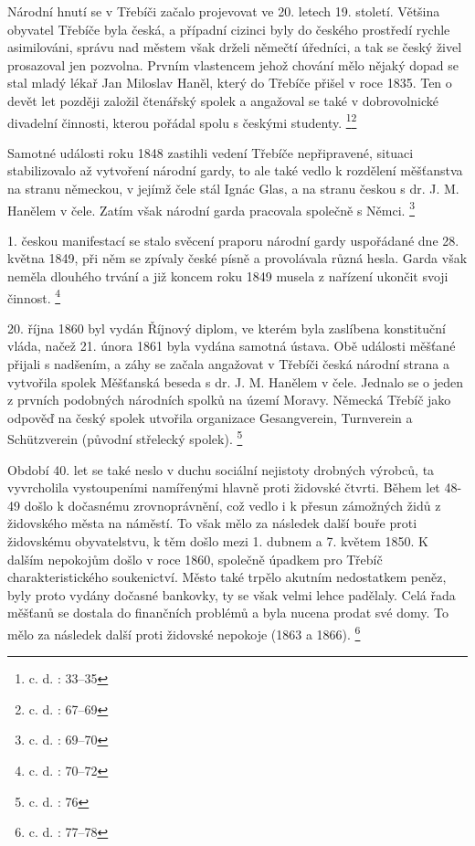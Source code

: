 \documentclass[a4paper,oneside,12p]{report}
\begin{document}
Národní hnutí se v Třebíči začalo projevovat ve 20. letech 19. století.
Většina obyvatel Třebíče byla česká, a případní cizinci byly do českého prostředí rychle asimilováni, správu nad městem však drželi němečtí úředníci, a tak se český živel prosazoval jen pozvolna.
Prvním vlastencem jehož chování mělo nějaký dopad se stal mladý lékař Jan Miloslav Haněl, který do Třebíče přišel v roce 1835.
Ten o devět let později založil čtenářský spolek a angažoval se také v dobrovolnické divadelní činnosti, kterou pořádal spolu s českými studenty. \footnote{c. d. : 33--35}\footnote{c. d. : 67--69}

Samotné události roku 1848 zastihli vedení Třebíče nepřipravené, situaci stabilizovalo až vytvoření národní gardy, to ale také vedlo k rozdělení měšťanstva na stranu německou, v jejímž čele stál Ignác Glas, a na stranu českou s dr. J. M. Hanělem v čele.
Zatím však národní garda pracovala společně s Němci. \footnote{c. d. : 69--70}

1. českou manifestací se stalo svěcení praporu národní gardy uspořádané dne 28. května 1849, při něm se zpívaly české písně a provolávala různá hesla.
Garda však neměla dlouhého trvání a již koncem roku 1849 musela z nařízení ukončit svoji činnost. \footnote{c. d. : 70--72}

20. října 1860 byl vydán Říjnový diplom, ve kterém byla zaslíbena konstituční vláda, načež 21. února 1861 byla vydána samotná ústava.
Obě události měšťané přijali s nadšením, a záhy se začala angažovat v Třebíči česká národní strana a vytvořila spolek Měšťanská beseda s dr. J. M. Hanělem v čele.
Jednalo se o jeden z prvních podobných národních spolků na území Moravy.
Německá Třebíč jako odpověď na český spolek utvořila organizace Gesangverein, Turnverein a Schützverein (původní střelecký spolek). \footnote{c. d. : 76}

Období 40. let se také neslo v duchu sociální nejistoty drobných výrobců, ta vyvrcholila vystoupeními namířenými hlavně proti židovské čtvrti.
Během let 48-49 došlo k dočasnému zrovnoprávnění, což vedlo i k přesun zámožných židů z židovského města na náměstí.
To však mělo za následek další bouře proti židovskému obyvatelstvu, k těm došlo mezi 1. dubnem a 7. květem 1850.
K dalším nepokojům došlo v roce 1860, společně úpadkem pro Třebíč charakteristického soukenictví.
Město také trpělo akutním nedostatkem peněz, byly proto vydány dočasné bankovky, ty se však velmi lehce padělaly.
Celá řada měšťanů se dostala do finančních problémů a byla nucena prodat své domy.
To mělo za následek další proti židovské nepokoje (1863 a 1866). \footnote{c. d. : 77--78}
\end{document}

